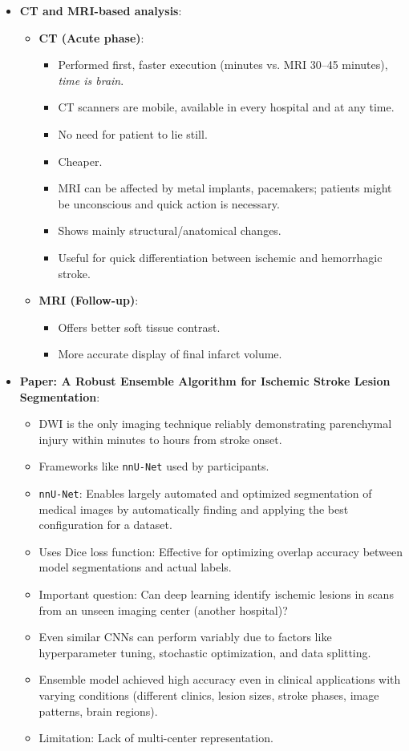 \documentclass[a4paper,12pt]{article}
\begin{document}
\begin{itemize}
    \item \textbf{CT and MRI-based analysis}:
    \begin{itemize}
        \item \textbf{CT (Acute phase)}:
        \begin{itemize}
            \item Performed first, faster execution (minutes vs. MRI 30–45 minutes), \textit{time is brain}.
            \item CT scanners are mobile, available in every hospital and at any time.
            \item No need for patient to lie still.
            \item Cheaper.
            \item MRI can be affected by metal implants, pacemakers; patients might be unconscious and quick action is necessary.
            \item Shows mainly structural/anatomical changes.
            \item Useful for quick differentiation between ischemic and hemorrhagic stroke.
        \end{itemize}
        \item \textbf{MRI (Follow-up)}:
        \begin{itemize}
            \item Offers better soft tissue contrast.
            \item More accurate display of final infarct volume.
        \end{itemize}
    \end{itemize}

    \item \textbf{Paper: A Robust Ensemble Algorithm for Ischemic Stroke Lesion Segmentation}:
    \begin{itemize}
        \item DWI is the only imaging technique reliably demonstrating parenchymal injury within minutes to hours from stroke onset.
        \item Frameworks like \texttt{nnU-Net} used by participants.
        \item \texttt{nnU-Net}: Enables largely automated and optimized segmentation of medical images by automatically finding and applying the best configuration for a dataset.
        \item Uses Dice loss function: Effective for optimizing overlap accuracy between model segmentations and actual labels.
        \item Important question: Can deep learning identify ischemic lesions in scans from an unseen imaging center (another hospital)?
        \item Even similar CNNs can perform variably due to factors like hyperparameter tuning, stochastic optimization, and data splitting.
        \item Ensemble model achieved high accuracy even in clinical applications with varying conditions (different clinics, lesion sizes, stroke phases, image patterns, brain regions).
        \item Limitation: Lack of multi-center representation.
    \end{itemize}


\end{itemize}
\end{document}
